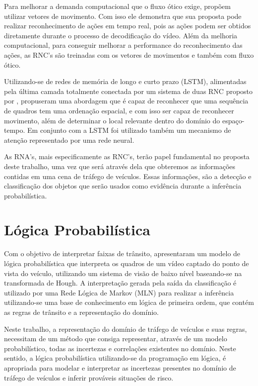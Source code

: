 \documentclass[
	12pt,				%
    oneside,			%
	a4paper,			%
	english,			%
	french,				%
	spanish,			%
	brazil,				%
	]{abntex2}
\begin{document}
Para melhorar a demanda computacional que o fluxo ótico exige,  propõem utilizar vetores de movimento. Com isso ele demonstra que sua proposta pode realizar reconhecimento de ações em tempo real, pois as ações podem ser obtidos diretamente durante o processo de decodificação do vídeo. Além da melhoria computacional, para conseguir melhorar a performance do reconhecimento das ações, as RNC’s são treinadas com os vetores de movimentos e também com fluxo ótico.

Utilizando-se de redes de memória de longo e curto prazo (LSTM), alimentadas pela última camada totalmente conectada por um sistema de duas RNC proposto por ,  propuseram uma abordagem que é capaz de reconhecer que uma sequência de quadros tem uma ordenação espacial, e com isso ser capaz de reconhecer movimento, além de determinar o local relevante dentro do domínio do espaço-tempo. Em conjunto com a LSTM foi utilizado também um mecanismo de atenção representado por uma rede neural.

As RNA's, mais especificamente as RNC's, terão papel fundamental no proposta deste trabalho, uma vez que será através dela que obteremos as informações contidas em uma cena de tráfego de veículos. Essas informações, são a detecção e classificação dos objetos que serão usados como evidência durante a inferência probabilística.

\section {Lógica Probabilística}

Com o objetivo de interpretar faixas de trânsito,  apresentaram um modelo de lógica probabilística que interpreta os quadros de um vídeo captado do ponto de vista do veículo, utilizando um sistema de visão de baixo nível baseando-se na transformada de Hough. A interpretação gerada pela saída da classificação é utilizado por uma Rede Lógica de Markov (MLN) para realizar a inferência utilizando-se uma base de conhecimento em lógica de primeira ordem, que contém as regras de trânsito e a representação do domínio. 

Neste trabalho, a representação do domínio de tráfego de veículos e suas regras, necessitam de um método que consiga representar, através de um modelo probabilístico, todas as incertezas e correlações existentes no domínio. Neste sentido, a lógica probabilística utilizando-se da programação em lógica, é apropriada para modelar e interpretar as incertezas presentes no domínio de tráfego de veículos e inferir prováveis situações de risco.
\end{document}
